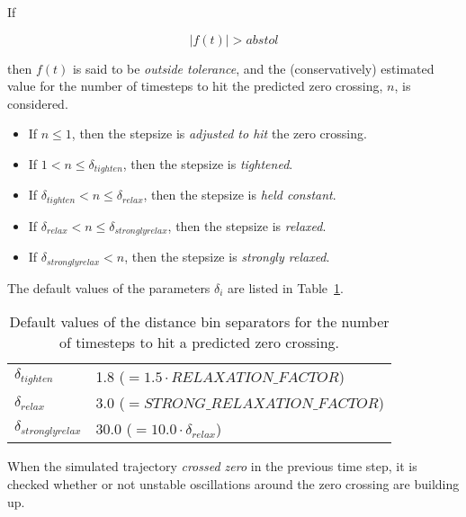 \noindent If

\begin{equation}
|f(t)| > abstol
\end{equation}

\noindent then $f(t)$ is said to be \textit{outside tolerance}, and the (conservatively) estimated value for the number of timesteps to hit the predicted zero crossing, $n$, is considered.

\begin{itemize}
	\item If $n \leq 1$, then the stepsize is \textit{adjusted to hit} the zero crossing.
	\item If $1<n \leq \delta_{tighten}$, then the stepsize is \textit{tightened}.
	\item If $\delta_{tighten}<n\leq \delta_{relax}$, then the stepsize is \textit{held constant}.
	\item If $\delta_{relax}<n \leq \delta_{stronglyrelax}$, then the stepsize is \textit{relaxed}.
	\item If $\delta_{stronglyrelax}<n$, then the stepsize is \textit{strongly relaxed}.
\end{itemize}

\noindent The default values of the parameters $\delta_i$ are listed in Table~\ref{tab:defvalbinsep}.

\begin{table}[h!]
\begin{center}
\caption{Default values of the distance bin separators for the number of timesteps to hit a predicted zero crossing.}
\label{tab:defvalbinsep}
\begin{tabular}{ l l }
	\hline
  $\delta_{tighten}$ & 1.8 ($= 1.5 \cdot RELAXATION\_FACTOR$) \\
  $\delta_{relax}$ & 3.0 ($= STRONG\_RELAXATION\_FACTOR$) \\
  $\delta_{stronglyrelax}$ & 30.0 ($= 10.0 \cdot \delta_{relax}$) \\
	\hline
\end{tabular}
\end{center}
\end{table}
\medskip

\noindent When the simulated trajectory \textit{crossed zero} in the previous time step, it is checked whether or not unstable oscillations around the zero crossing are building up.

